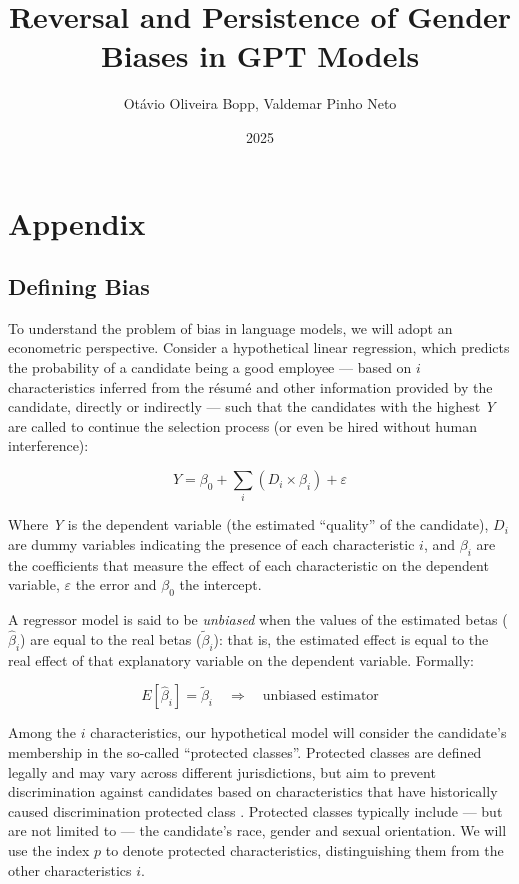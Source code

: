 \documentclass[12pt,a4paper]{article}
\title{Reversal and Persistence of Gender Biases in GPT Models}
\author{Otávio Oliveira Bopp, Valdemar Pinho Neto}
\date{2025}
\begin{document}
\maketitle

\section{Appendix}

\subsection{Defining Bias}




To understand the problem of bias in language models, we will
adopt an econometric perspective. Consider a hypothetical linear
regression, which predicts the probability of a candidate being a good
employee --- based on $i$ characteristics inferred from the résumé
and other information provided by the candidate, directly or indirectly
--- such that the candidates with the highest \textit{Y} are called to continue
the selection process (or even be hired without human
interference):

\begin{equation}
Y = \beta_0 + \sum_i (D_i \times \beta_i) + \varepsilon
\end{equation}

Where \textit{Y} is the dependent variable (the estimated ``quality'' of the
candidate), $D_i$ are dummy variables indicating the presence of each
characteristic $i$, and $\beta_i$ are the coefficients that measure the effect of
each characteristic on the dependent variable, $\varepsilon$ the error and $\beta_0$ the
intercept.

A regressor model is said to be \textit{unbiased} when the values of the estimated betas
($\hat{\beta}_i$) are equal to the real betas ($\tilde{\beta}_i$): that is, the
estimated effect is equal to the real effect of that explanatory variable on the
dependent variable. Formally:

\begin{equation}
E[\hat{\beta}_i] = \tilde{\beta}_i \quad \Rightarrow \quad \text{unbiased estimator}
\end{equation}

Among the $i$ characteristics, our hypothetical model will consider the
candidate's membership in the so-called ``protected classes''. Protected classes
are defined legally and may vary across different
jurisdictions, but aim to prevent discrimination against candidates based on
characteristics that have historically caused discrimination protected
class \citep{heymann2020}. Protected classes typically
include --- but are not limited to --- the candidate's race, gender
and sexual orientation. We will use the index $p$ to denote
protected characteristics, distinguishing them from the other characteristics
$i$.
\end{document}
